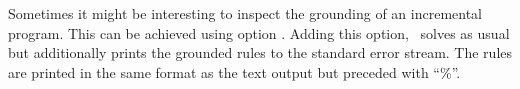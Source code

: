 Sometimes it might be interesting to inspect the grounding of an incremental program.
This can be achieved using option .
Adding this option, \clingo\ solves as usual
but additionally prints the grounded rules to the standard error stream.
The rules are printed in the same format as the text output but preceded with ``\%''.

